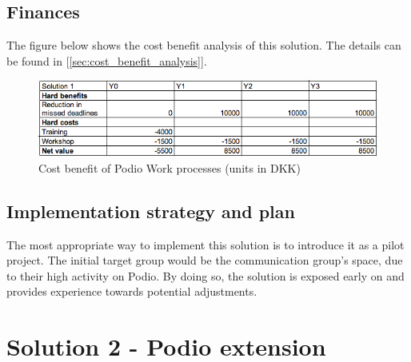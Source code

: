 \subsection{Finances}
The figure below shows the cost benefit analysis of this solution. The details can be found in [\ref{sec:cost_benefit_analysis}].
\begin{figure}[h!]
  \centering
\includegraphics[scale=0.5]{Pictures/cost-benefit1.png}
    \caption{Cost benefit of Podio Work processes (units in DKK)}
\end{figure}

\subsection{Implementation strategy and plan} 
The most appropriate way to implement this solution is to introduce it as a pilot project. The
initial target group would be the communication group's space, due to their high activity on Podio. By doing so, the solution is exposed early on and provides experience towards potential adjustments.

\section{Solution 2 - Podio extension}
